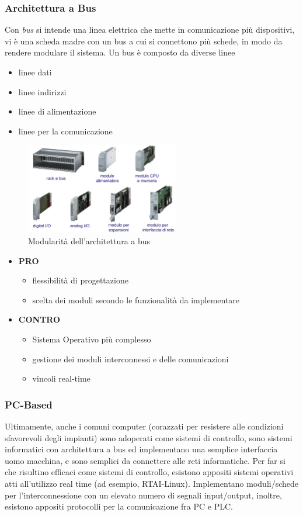 \documentclass[10pt, letterpaper]{report}
\begin{document}
\subsubsection{Architettura a Bus}
Con \textit{bus} si intende una linea elettrica che mette in comunicazione più dispositivi, vi è una scheda madre 
con un bus a cui si connettono più schede, in modo da rendere modulare il sistema. Un bus è composto da diverse 
linee\begin{itemize}
    \item linee dati 
    \item linee indirizzi 
    \item linee di alimentazione 
    \item linee per la comunicazione
\end{itemize}
\begin{figure}[h!]
    \centering
    \includegraphics[width=0.6\textwidth ]{images/bus.png}
    \caption{Modularità dell'architettura a bus}
\end{figure}
\begin{itemize}
    \item \textbf{PRO}\begin{itemize}
        \item flessibilità di progettazione 
        \item scelta dei moduli secondo le funzionalità da implementare
    \end{itemize}
    \item \textbf{CONTRO}\begin{itemize}
        \item Sistema Operativo più complesso
        \item  gestione dei moduli interconnessi e delle comunicazioni
        \item  vincoli real-time  
    \end{itemize}
\end{itemize}
\subsubsection{PC-Based}
Ultimamente, anche i comuni computer (corazzati per resistere alle condizioni 
sfavorevoli degli impianti) sono adoperati  come sistemi di controllo, sono sistemi informatici con architettura  
a bus ed implementano una semplice interfaccia uomo macchina, e sono semplici da connettere alle reti informatiche.\acc 
Per far si che risultino efficaci come sistemi di controllo, esistono appositi sistemi operativi atti 
all'utilizzo real time (ad esempio, RTAI-Linux). Implementano 
moduli/schede per l'interconnessione con un elevato numero di 
segnali input/output, inoltre, esistono appositi protocolli per la comunicazione fra PC e PLC.
\flowerLine
\end{document}
